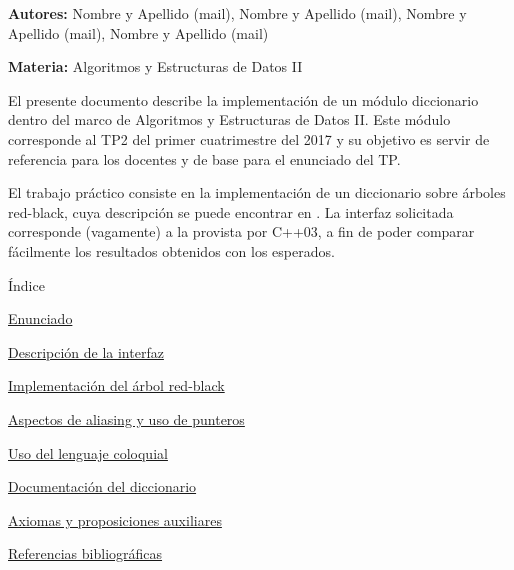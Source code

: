 
\begin{DoxyItemize}
\item {\bfseries Autores\+:} Nombre y Apellido (mail), Nombre y Apellido (mail), Nombre y Apellido (mail), Nombre y Apellido (mail)
\item {\bfseries Materia\+:} Algoritmos y Estructuras de Datos II
\end{DoxyItemize}

El presente documento describe la implementación de un módulo diccionario dentro del marco de Algoritmos y Estructuras de Datos II. Este módulo corresponde al T\+P2 del primer cuatrimestre del 2017 y su objetivo es servir de referencia para los docentes y de base para el enunciado del TP.

El trabajo práctico consiste en la implementación de un diccionario sobre árboles red-\/black, cuya descripción se puede encontrar en \cite{CormenLeisersonRivestStein2009}. La interfaz solicitada corresponde (vagamente) a la provista por C++03, a fin de poder comparar fácilmente los resultados obtenidos con los esperados.

\begin{DoxyParagraph}{Índice}

\end{DoxyParagraph}

\begin{DoxyItemize}
\item \hyperlink{Enunciado}{Enunciado}
\item \hyperlink{Interfaz}{Descripción de la interfaz}
\item \hyperlink{Implementacion}{Implementación del árbol red-\/black}
\item \hyperlink{Aliasing}{Aspectos de aliasing y uso de punteros}
\item \hyperlink{Castellano}{Uso del lenguaje coloquial}
\item \hyperlink{classaed2_1_1map}{Documentación del diccionario }
\item \hyperlink{axiomas}{Axiomas y proposiciones auxiliares}
\item \hyperlink{citelist}{Referencias bibliográficas} 
\end{DoxyItemize}
